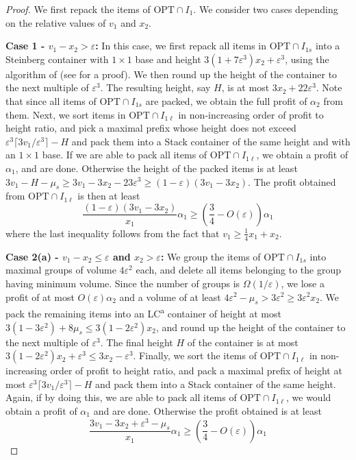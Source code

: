 \documentclass[10pt,a4paper]{amsart}
\renewcommand{\epsilon}{\varepsilon} %
\theoremstyle{definition}
\begin{document}
\iffalse
\begin{proof}
    We first repack the items of $\text{OPT}\cap I_1$. We consider two cases depending on the relative values of $v_1$ and $x_2$.

    \textbf{Case 1 - $v_1-x_2 >\epsilon$:} In this case, we first repack all items in $\text{OPT}\cap I_{1s}$ into a Steinberg container with $1\times 1$ base and height $3(1+7\epsilon^3)x_2 + \epsilon^3$, using the algorithm of  (see  for a proof). We then round up the height of the container to the next multiple of $\epsilon^3$. The resulting height, say $H$, is at most $3x_2+ 22\epsilon^3$. Note that since all items of $\text{OPT}\cap I_{1s}$ are packed, we obtain the full profit of $\alpha_2$ from them. Next, we sort items in $\text{OPT}\cap I_{1\ell}$ in non-increasing order of profit to height ratio, and pick a maximal prefix whose height does not exceed $\epsilon^3\lceil 3v_1/\epsilon^3\rceil -H$ and pack them into a Stack container of the same height and with an $1\times 1$ base. If we are able to pack all items of $\text{OPT}\cap I_{1\ell}$, we obtain a profit of $\alpha_1$, and are done. Otherwise the height of the packed items is at least $3v_1-H-\mu_s\ge 3v_1-3x_2-23\epsilon^3 \ge (1-\epsilon)(3v_1 - 3x_2)$. The profit obtained from $\text{OPT}\cap I_{1\ell}$ is then at least
    \[ \frac{(1-\epsilon)(3v_1-3x_2)}{x_1}\alpha_1 \ge \left(\frac{3}{4}-O(\epsilon)\right)\alpha_1 \]
    where the last inequality follows from the fact that $v_1\ge \frac{1}{4}x_1+x_2$.

    \textbf{Case 2(a) - $v_1-x_2 \le \epsilon$ and $x_2>\epsilon$:} We group the items of $\text{OPT}\cap I_{1s}$ into maximal groups of volume $4\epsilon^2$ each, and delete all items belonging to the group having minimum volume. Since the number of groups is $\Omega(1/\epsilon)$, we lose a profit of at most $O(\epsilon)\alpha_2$ and a volume of at least $4\epsilon^2-\mu_s > 3\epsilon^2 \ge 3\epsilon^2 x_2$. We pack the remaining items into an LC\textsuperscript{a} container of height at most $3(1-3\epsilon^2)+8\mu_s \le 3(1-2\epsilon^2)x_2$, and round up the height of the container to the next multiple of $\epsilon^3$. The final height $H$ of the container is at most $3(1-2\epsilon^2)x_2+\epsilon^3 \le 3x_2 - \epsilon^3$. Finally, we sort the items of $\text{OPT}\cap I_{1\ell}$ in non-increasing order of profit to height ratio, and pack a maximal prefix of height at most $\epsilon^3\lceil 3v_1/\epsilon^3\rceil -H$ and pack them into a Stack container of the same height. Again, if by doing this, we are able to pack all items of $\text{OPT}\cap I_{1\ell}$, we would obtain a profit of $\alpha_1$ and are done. Otherwise the profit obtained is at least 
    \[ \frac{3v_1-3x_2+\epsilon^3-\mu_s}{x_1}\alpha_1 \ge \left(\frac{3}{4}-O(\epsilon)\right)\alpha_1 \]
    

\end{proof}
\end{document}
